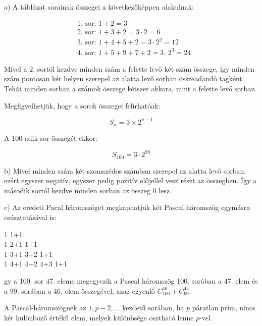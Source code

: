 \begin{solution}
a) A táblázat sorainak összegei a következőképpen alakulnak:

\begin{align*}
 & \text{1. sor: }1+2=3\\
 & \text{2. sor: }1+3+2=3\cdot2=6\\
 & \text{3. sor: }1+4+5+2=3\cdot2^{2}=12\\
 & \text{4. sor: }1+5+9+7+2=3\cdot2^{3}=24
\end{align*}

Mivel a 2. sortól kezdve minden szám a felette levő két szám összege,
így minden szám pontosan két helyen szerepel az alatta levő sorban
összeadandó tagként. Tehát minden sorban a számok összege kétszer
akkora, mint a felette levő sorban.

Megfigyelhetjük, hogy a sorok összegei felírhatóak:

\[
S_{n}=3\times2^{n-1}
\]

A 100-adik sor összegét ekkor:

\[
S_{100}=3\cdot2^{99}
\]

b) Mivel minden szám két szomszédos számban szerepel az alatta levő
sorban, ezért egyszer negatív, egyszer pedig pozitív előjellel vesz
részt az összegben. Így a második sortól kezdve minden sorban az összeg
0 lesz.

c) Az eredeti Pacal háromszöget megkaphatjuk két Pascal háromszög
egymásra csúsztatásával is: 
\begin{center}
1 \quad{}1+1 \\
 1 \quad{}2+1 \quad{}1+1 \\
 1 \quad{}3+1 \quad{}3+2 \quad{}1+1 \\
 1 \quad{}4+1 \quad{}4+2 \quad{}4+3 \quad{}1+1 
\par\end{center}
gy a 100. sor 47. eleme megegyezik a Pascal háromszög 100. sorában
a 47. elem és a 99. sorában a 46. elem összegével, azaz egyenlő $C_{100}^{46}+C_{99}^{45}$. 
\end{solution}
\begin{extraproblem}
A Pascal-háromszögnek az $1,p-2,\dots$ kezdetű sorában, ha $p$
páratlan prím, nincs két különböző értékű elem, melyek különbsége
osztható lenne $p$-vel. 
\end{extraproblem}

